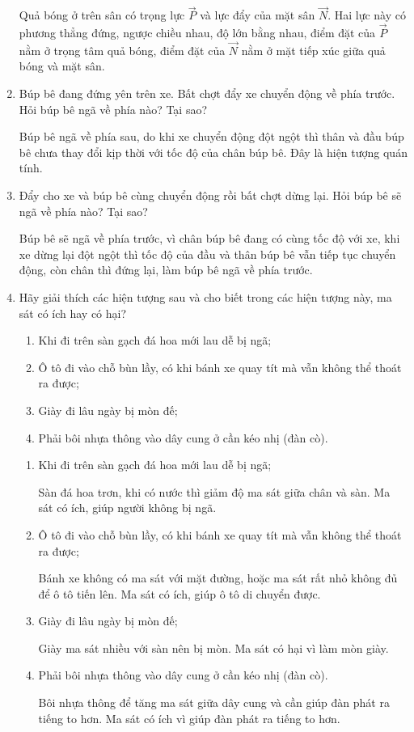 \begin{enumerate}[label=\bfseries Câu \arabic*:]
{		Quả bóng ở trên sân có trọng lực $\vec P$ và lực đẩy của mặt sân $\vec N$. Hai lực này có phương thẳng đứng, ngược chiều nhau, độ lớn bằng nhau, điểm đặt của $\vec P$ nằm ở trọng tâm quả bóng, điểm đặt của $\vec N$ nằm ở mặt tiếp xúc giữa quả bóng và mặt sân.
	}
	\item {}
	
	
	{Búp bê đang đứng yên trên xe. Bất chợt đẩy xe chuyển động về phía trước. Hỏi búp bê ngã về phía nào? Tại sao?
	}
	
	\hideall
	{Búp bê ngã về phía sau, do khi xe chuyển động đột ngột thì thân và đầu búp bê chưa thay đổi kịp thời với tốc độ của chân búp bê. Đây là hiện tượng quán tính.
	}
	\item {}
	
	
	{Đẩy cho xe và búp bê cùng chuyển động rồi bất chợt dừng lại. Hỏi búp bê sẽ ngã về phía nào? Tại sao?
	}
	
	\hideall
	{Búp bê sẽ ngã về phía trước, vì chân búp bê đang có cùng tốc độ với xe, khi xe dừng lại đột ngột thì tốc độ của đầu và thân búp bê vẫn tiếp tục chuyển động, còn chân thì đứng lại, làm búp bê ngã về phía trước.
	}
	\item {}
	
	
	{Hãy giải thích các hiện tượng sau và cho biết trong các hiện tượng này, ma sát có ích hay có hại?
		\begin{enumerate}
			\item Khi đi trên sàn gạch đá hoa mới lau dễ bị ngã;
			\item Ô tô đi vào chỗ bùn lầy, có khi bánh xe quay tít mà vẫn không thể thoát ra được;
			\item Giày đi lâu ngày bị mòn đế;
			\item Phải bôi nhựa thông vào dây cung ở cần kéo nhị (đàn cò).
		\end{enumerate}
	}
	
	\hideall
	{
		\begin{enumerate}
			\item Khi đi trên sàn gạch đá hoa mới lau dễ bị ngã;
			
			Sàn đá hoa trơn, khi có nước thì giảm độ ma sát giữa chân và sàn. Ma sát có ích, giúp người không bị ngã.
			
			\item Ô tô đi vào chỗ bùn lầy, có khi bánh xe quay tít mà vẫn không thể thoát ra được;
			
			Bánh xe không có ma sát với mặt đường, hoặc ma sát rất nhỏ không đủ để ô tô tiến lên. Ma sát có ích, giúp ô tô di chuyển được.
			
			\item Giày đi lâu ngày bị mòn đế;
			
			Giày ma sát nhiều với sàn nên bị mòn. Ma sát có hại vì làm mòn giày.
			
			\item Phải bôi nhựa thông vào dây cung ở cần kéo nhị (đàn cò).
			
			Bôi nhựa thông để tăng ma sát giữa dây cung và cần giúp đàn phát ra tiếng to hơn. Ma sát có ích vì giúp đàn phát ra tiếng to hơn.
		\end{enumerate}
	}
\end{enumerate}